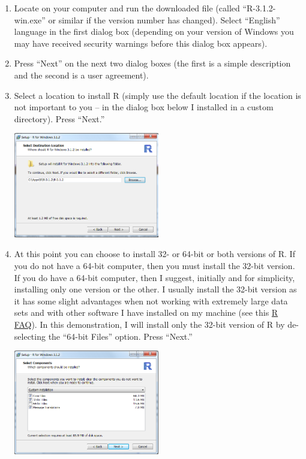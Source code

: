 \documentclass{article}\usepackage[]{graphicx}\usepackage[]{color}
\begin{document}
\begin{enumerate}
  \item Locate on your computer and run the downloaded file (called ``R-3.1.2-win.exe'' or similar if the version number has changed).  Select ``English'' language in the first dialog box (depending on your version of Windows you may have received security warnings before this dialog box appears).

  \item Press ``Next'' on the next two dialog boxes (the first is a simple description and the second is a user agreement).

  \item Select a location to install R (simply use the default location if the location is not important to you -- in the dialog box below I installed in a custom directory).  Press ``Next.''
\begin{center}
  \includegraphics[width=2.5in]{Figs/R_Install_Directory.png}
\end{center}

  \item At this point you can choose to install 32- or 64-bit or both versions of R.  If you do not have a 64-bit computer, then you must install the 32-bit version.  If you do have a 64-bit computer, then I suggest, initially and for simplicity, installing only one version or the other.  I usually install the 32-bit version as it has some slight advantages when not working with extremely large data sets and with other software I have installed on my machine (see this \href{http://streaming.stat.iastate.edu/CRAN/bin/windows/base/rw-FAQ.html#Should-I-run-32_002dbit-or-64_002dbit-R_003f}{R FAQ}).  In this demonstration, I will install only the 32-bit version of R by de-selecting the ``64-bit Files'' option.  Press ``Next.''
\begin{center}
  \includegraphics[width=2.5in]{Figs/R_Install_32Bit.png}
\end{center}


\end{enumerate}
\end{document}
